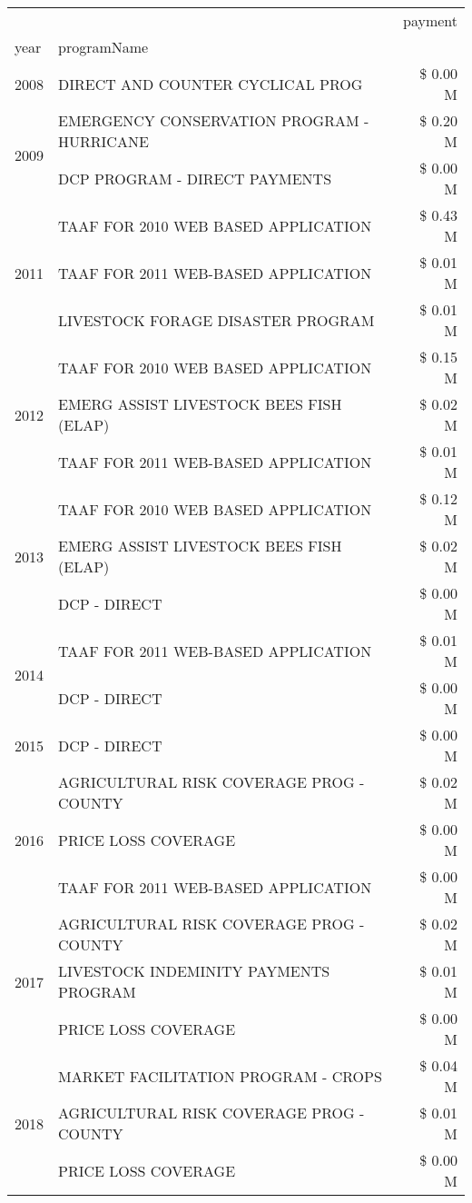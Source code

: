 \begin{tabular}{llr}
\toprule
 &  & payment \\
year & programName &  \\
\midrule
2008 & DIRECT AND COUNTER CYCLICAL PROG & \$ 0.00 M \\
\cline{1-3}
\multirow[t]{2}{*}{2009} & EMERGENCY CONSERVATION PROGRAM - HURRICANE & \$ 0.20 M \\
 & DCP PROGRAM - DIRECT PAYMENTS & \$ 0.00 M \\
\cline{1-3}
\multirow[t]{3}{*}{2011} & TAAF FOR 2010 WEB BASED APPLICATION & \$ 0.43 M \\
 & TAAF FOR 2011 WEB-BASED APPLICATION & \$ 0.01 M \\
 & LIVESTOCK FORAGE DISASTER PROGRAM & \$ 0.01 M \\
\cline{1-3}
\multirow[t]{3}{*}{2012} & TAAF FOR 2010 WEB BASED APPLICATION & \$ 0.15 M \\
 & EMERG ASSIST LIVESTOCK BEES FISH (ELAP) & \$ 0.02 M \\
 & TAAF FOR 2011 WEB-BASED APPLICATION & \$ 0.01 M \\
\cline{1-3}
\multirow[t]{3}{*}{2013} & TAAF FOR 2010 WEB BASED APPLICATION & \$ 0.12 M \\
 & EMERG ASSIST LIVESTOCK BEES FISH (ELAP) & \$ 0.02 M \\
 & DCP - DIRECT & \$ 0.00 M \\
\cline{1-3}
\multirow[t]{2}{*}{2014} & TAAF FOR 2011 WEB-BASED APPLICATION & \$ 0.01 M \\
 & DCP - DIRECT & \$ 0.00 M \\
\cline{1-3}
2015 & DCP - DIRECT & \$ 0.00 M \\
\cline{1-3}
\multirow[t]{3}{*}{2016} & AGRICULTURAL RISK COVERAGE PROG - COUNTY & \$ 0.02 M \\
 & PRICE LOSS COVERAGE & \$ 0.00 M \\
 & TAAF FOR 2011 WEB-BASED APPLICATION & \$ 0.00 M \\
\cline{1-3}
\multirow[t]{3}{*}{2017} & AGRICULTURAL RISK COVERAGE PROG - COUNTY & \$ 0.02 M \\
 & LIVESTOCK INDEMINITY PAYMENTS PROGRAM & \$ 0.01 M \\
 & PRICE LOSS COVERAGE & \$ 0.00 M \\
\cline{1-3}
\multirow[t]{3}{*}{2018} & MARKET FACILITATION PROGRAM - CROPS & \$ 0.04 M \\
 & AGRICULTURAL RISK COVERAGE PROG - COUNTY & \$ 0.01 M \\
 & PRICE LOSS COVERAGE & \$ 0.00 M \\

\end{tabular}

